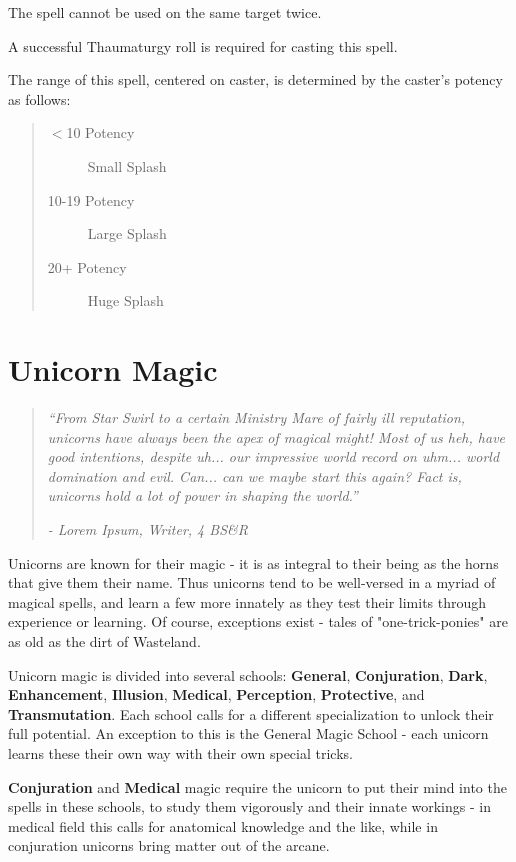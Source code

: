 \documentclass[11pt,a4paper,twocolumn]{book}
\begin{document}
The spell cannot be used on the same target twice.

A successful Thaumaturgy roll is required for casting this spell.

The range of this spell, centered on caster, is determined by the caster's potency as follows:
\begin{quote}
	\begin{description}
		\item[$<$10 Potency] 	Small Splash
		\item[10-19 Potency] 	Large Splash
		\item[20+ Potency] 	Huge Splash
	\end{description}	
\end{quote}   

\chapter{Unicorn Magic}

\begin{quote}
	\emph{``From Star Swirl to a certain Ministry Mare of fairly ill reputation, unicorns have always been the apex of magical might! Most of us heh, have good intentions, despite uh... our impressive world record on uhm... world domination and evil. Can... can we maybe start this again? Fact is, unicorns hold a lot of power in shaping the world.''}
	
	\emph{- Lorem Ipsum, Writer, 4 BS\&R}
\end{quote}

Unicorns are known for their magic - it is as integral to their being as the horns that give them their name. Thus unicorns tend to be well-versed in a myriad of magical spells, and learn a few more innately as they test their limits through experience or learning. Of course, exceptions exist - tales of "one-trick-ponies" are as old as the dirt of Wasteland.

Unicorn magic is divided into several schools: \textbf{General}, \textbf{Conjuration}, \textbf{Dark}, \textbf{Enhancement}, \textbf{Illusion}, \textbf{Medical}, \textbf{Perception}, \textbf{Protective}, and \textbf{Transmutation}. Each school calls for a different specialization to unlock their full potential. An exception to this is the General Magic School - each unicorn learns these their own way with their own special tricks.

\textbf{Conjuration} and \textbf{Medical} magic require the unicorn to put their mind into the spells in these schools, to study them vigorously and their innate workings - in medical field this calls for anatomical knowledge and the like, while in conjuration unicorns bring matter out of the arcane.
\end{document}
